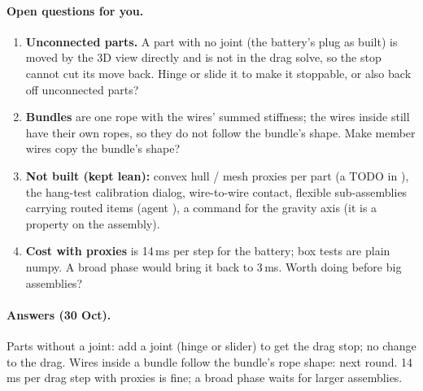 \paragraph{Open questions for you.}
\begin{enumerate}[nosep]
  \item \textbf{Unconnected parts.} A part with no joint (the battery's plug as built) is moved by the 3D view directly
        and is not in the drag solve, so the stop cannot cut its move back. Hinge or slide it to make it stoppable, or
        also back off unconnected parts?
  \item \textbf{Bundles} are one rope with the wires' summed stiffness; the wires inside still have their own ropes, so
        they do not follow the bundle's shape. Make member wires copy the bundle's shape?
  \item \textbf{Not built (kept lean):} convex hull / mesh proxies per part (a TODO in ), the hang-test
        calibration dialog, wire-to-wire contact, flexible sub-assemblies carrying routed items (agent ), a
        command for the gravity axis (it is a property on the assembly).
  \item \textbf{Cost with proxies} is 14\,ms per step for the battery; box tests are plain numpy. A broad phase would bring it
        back to 3\,ms. Worth doing before big assemblies?
\end{enumerate}

\paragraph{Answers (30 Oct).} Parts without a joint: add a joint (hinge or slider) to get the drag stop; no
change to the drag. Wires inside a bundle follow the bundle's rope shape: next round. 14\,ms per drag step with
proxies is fine; a broad phase waits for larger assemblies.


